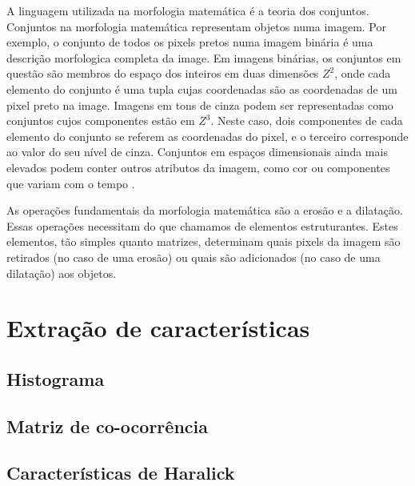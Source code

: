 A linguagem utilizada na morfologia matemática é a teoria dos conjuntos. Conjuntos na morfologia matemática representam objetos numa imagem. Por exemplo, o conjunto de todos os pixels pretos numa imagem binária é uma descrição morfologica completa da image. Em imagens binárias, os conjuntos em questão são membros do espaço dos inteiros em duas dimensões $Z^2$, onde cada elemento do conjunto é uma tupla cujas coordenadas são as coordenadas de um pixel preto na image. Imagens em tons de cinza podem ser representadas como conjuntos cujos componentes estão em $Z^3$. Neste caso, dois componentes de cada elemento do conjunto se referem as coordenadas do pixel, e o terceiro corresponde ao valor do seu nível de cinza. Conjuntos em espaços dimensionais ainda mais elevados podem conter outros atributos da imagem, como cor ou componentes que variam com o tempo \cite{gonzalez}.

As operações fundamentais da morfologia matemática são a erosão e a dilatação. Essas operações necessitam do que chamamos de elementos estruturantes. Estes elementos, tão simples quanto matrizes, determinam quais pixels da imagem são retirados (no caso de uma erosão) ou quais são adicionados (no caso de uma dilatação) aos objetos.



\section{Extração de características}

\subsection{Histograma}

\subsection{Matriz de co-ocorrência}

\subsection{Características de Haralick}